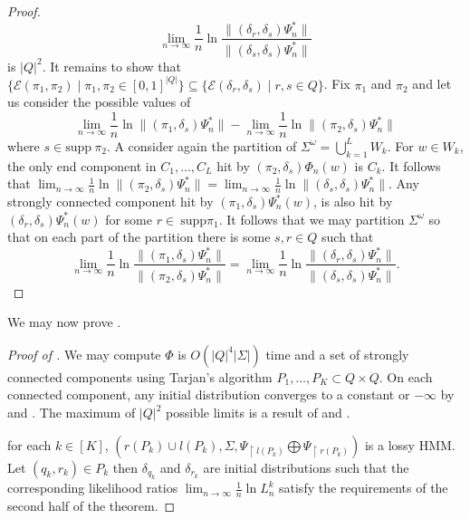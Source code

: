 \documentclass[a4paper,UKenglish,cleveref, autoref,mathscr]{lipics-v2019}
\newcommand{\Epsilon}{\mathcal{E}}
\newcommand{\1}{\mathbbm{1}}
\newcommand{\supp}{\mathrm{supp}}
\newcommand{\liexp}{\lim_{n\rightarrow\infty} \frac1n \ln L_n}
\begin{document}
\begin{proof}
\begin{equation*}
\lim_{n \rightarrow \infty} \frac{1}{n} \ln \frac{\| (\delta_r, \delta_s) \Psi_n^* \|}{\| (\delta_s, \delta_s) \Psi_n^* \|}
\end{equation*}
is $|Q|^2$. It remains to show that $\{\Epsilon(\pi_1, \pi_2) \mid \pi_1, \pi_2 \in [0,1]^{|Q|}\} \subseteq \{\Epsilon(\delta_r, \delta_s) \mid r, s \in Q\}$. Fix $\pi_1$ and $\pi_2$ and let us consider the possible values of 
\begin{equation*}
\lim_{n \rightarrow \infty} \frac1n \ln \| (\pi_1, \delta_s) \Psi_n^*\| - \lim_{n \rightarrow \infty} \frac1n \ln \| (\pi_2, \delta_s) \Psi_n^*\|
\end{equation*}
where $s \in \supp ~\pi_2$. A consider again the partition of $\Sigma^\omega = \bigcup_{k = 1}^L W_k$. For $w \in W_k$, the only end component in $C_1, \dots, C_L$ hit by $(\pi_2, \delta_s) \Phi_n(w)$ is $C_k$. It follows that $\lim_{n \rightarrow \infty} \frac1n \ln \| (\pi_2, \delta_s) \Psi_n^* \| = \lim_{n \rightarrow \infty} \frac1n \ln \| (\delta_s, \delta_s) \Psi_n^* \|$. Any strongly connected component hit by $(\pi_1, \delta_s) \Psi_n^*(w)$, is also hit by $(\delta_r, \delta_s) \Psi_n^*(w)$ for some $r \in ~\supp \pi_1$.  It follows that we may partition $\Sigma^\omega$ so that on each part of the partition there is some $s, r \in Q$ such that 
\begin{equation*}
\lim_{n \rightarrow \infty} \frac1n \ln \frac{ \| (\pi_1, \delta_s) \Psi_n^*\| }{ \| (\pi_2, \delta_s) \Psi_n^*\|} = \lim_{n \rightarrow \infty} \frac1n \ln \frac{ \| (\delta_r, \delta_s) \Psi_n^*\| }{ \| (\delta_s, \delta_s) \Psi_n^*\|}.
\end{equation*}
\end{proof}

We may now prove .

\begin{proof}[Proof of ]
We may compute $\Phi$ is $O(|Q|^4 |\Sigma|)$ time and a set of strongly connected components using Tarjan's algorithm $P_1, \dots, P_K \subset Q \times Q$. On each connected component, any initial distribution converges to a constant or $-\infty$ by  and . The  maximum of $|Q|^2$ possible limits is a result of  and .

for each $k \in [K]$, $(r(P_k) \cup l(P_k), \Sigma, \Psi_{\restriction l(P_k)} \bigoplus \Psi_{\restriction r(P_k)})$ is a lossy HMM. Let $(q_k,r_k) \in P_k$ then $\delta_{q_k}$ and $\delta_{r_k}$ are initial distributions such that the corresponding likelihood ratios $\liexp^k$ satisfy the requirements of the second half of the theorem.
\end{proof}
\end{document}
